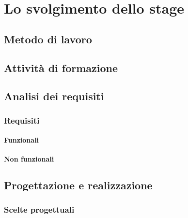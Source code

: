 
\chapter{Lo svolgimento dello stage}
\label{cap:svolgimento-stage}
\vspace{20pt}
\section{Metodo di lavoro}

\section{Attività di formazione}

\section{Analisi dei requisiti}

\subsection{Requisiti}

\subsubsection{Funzionali}

\subsubsection{Non funzionali}


\section{Progettazione e realizzazione}

\subsection{Scelte progettuali}

